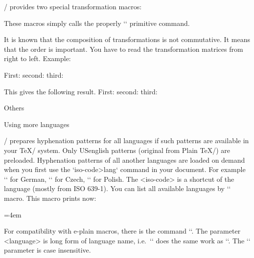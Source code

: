 {\OpTeX/ provides two special transformation macros:

\begtt
{} 
\endtt 

These macros simply calls the
properly `\pdfsetmatrix` primitive command.

It is known that the composition of transformations is not commutative. It
means that the order is important. You have to read the transformation
matrices from right to left. Example:

\begtt
First: \pdfsave {}\pdfrestore
second: \pdfsave {}\pdfrestore
third: \pdfsave {}%
       \pdfrestore %
\endtt
%
\par\nobreak\bigskip\smallskip
This gives the following result. 
First: \pdfsave {}\pdfrestore
second: \pdfsave {}\pdfrestore
third: \pdfsave {}\pdfrestore
\bigskip\bigskip


\sec Others

\secc[lang] Using more languages

\OpTeX/ prepares hyphenation patterns for all languages if such patterns are
available in your \TeX/ system. 
\new
Only USenglish patterns (original from Plain \TeX/) are preloaded.
Hyphenation patterns of all another languages are loaded on demand when you first use
the `\<iso-code>lang` command in your document. 
For example `\delang` for German, `\cslang` for
Czech, `\pllang` for Polish. The <iso-code> is a shortcut 
of the language (mostly from ISO 639-1). 
You can list all available languages by `\langlist` 
macro. This macro prints now:

\medskip
{\typosize[9/11.5]\emergencystretch=4em 
\noindent \langlist
\par}
\medskip

\new
For compatibility with e-plain macros, there is the command
``. The parameter <language> is long form of
language name, i.e.\ `` does the same work as `\cslang`.
The `\uselanguage` parameter is case insensitive.

}
